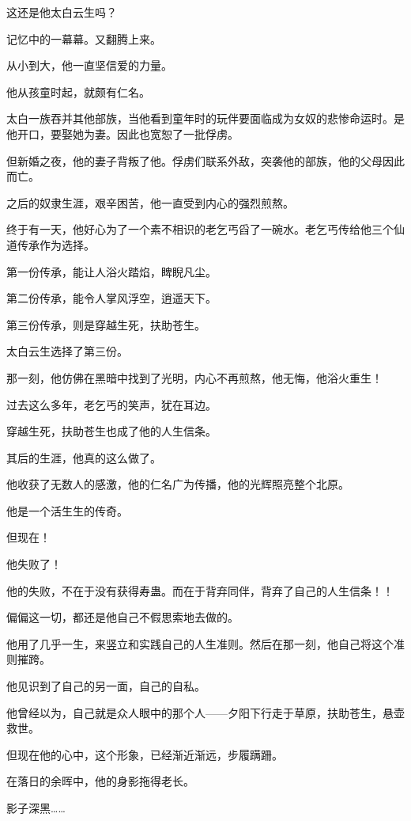 \begin{this_body}
这还是他太白云生吗？

记忆中的一幕幕。又翻腾上来。

从小到大，他一直坚信爱的力量。

他从孩童时起，就颇有仁名。

太白一族吞并其他部族，当他看到童年时的玩伴要面临成为女奴的悲惨命运时。是他开口，要娶她为妻。因此也宽恕了一批俘虏。

但新婚之夜，他的妻子背叛了他。俘虏们联系外敌，突袭他的部族，他的父母因此而亡。

之后的奴隶生涯，艰辛困苦，他一直受到内心的强烈煎熬。

终于有一天，他好心为了一个素不相识的老乞丐舀了一碗水。老乞丐传给他三个仙道传承作为选择。

第一份传承，能让人浴火踏焰，睥睨凡尘。

第二份传承，能令人掌风浮空，逍遥天下。

第三份传承，则是穿越生死，扶助苍生。

太白云生选择了第三份。

那一刻，他仿佛在黑暗中找到了光明，内心不再煎熬，他无悔，他浴火重生！

过去这么多年，老乞丐的笑声，犹在耳边。

穿越生死，扶助苍生也成了他的人生信条。

其后的生涯，他真的这么做了。

他收获了无数人的感激，他的仁名广为传播，他的光辉照亮整个北原。

他是一个活生生的传奇。

但现在！

他失败了！

他的失败，不在于没有获得寿蛊。而在于背弃同伴，背弃了自己的人生信条！！

偏偏这一切，都还是他自己不假思索地去做的。

他用了几乎一生，来竖立和实践自己的人生准则。然后在那一刻，他自己将这个准则摧跨。

他见识到了自己的另一面，自己的自私。

他曾经以为，自己就是众人眼中的那个人——夕阳下行走于草原，扶助苍生，悬壶救世。

但现在他的心中，这个形象，已经渐近渐远，步履蹒跚。

在落日的余晖中，他的身影拖得老长。

影子深黑……

\end{this_body}

